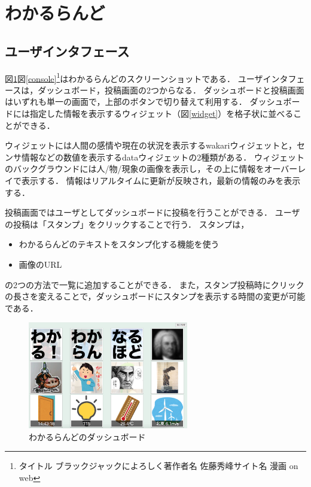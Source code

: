 \section{わかるらんど}

\subsection{ユーザインタフェース}

図\ref{dashboard}図\ref{console}\footnote{タイトル ブラックジャックによろしく\newline 著作者名 佐藤秀峰\newline サイト名 漫画 on web}はわかるらんどのスクリーンショットである．
ユーザインタフェースは，ダッシュボード，投稿画面の2つからなる．
ダッシュボードと投稿画面はいずれも単一の画面で，上部のボタンで切り替えて利用する．
ダッシュボードには指定した情報を表示するウィジェット（図\ref{widget}）を格子状に並べることができる．

ウィジェットには人間の感情や現在の状況を表示するwakariウィジェットと，センサ情報などの数値を表示するdataウィジェットの2種類がある．
ウィジェットのバックグラウンドには人/物/現象の画像を表示し，その上に情報をオーバーレイで表示する．
情報はリアルタイムに更新が反映され，最新の情報のみを表示する．

投稿画面ではユーザとしてダッシュボードに投稿を行うことができる．
ユーザの投稿は「スタンプ」をクリックすることで行う．
スタンプは，
\begin{itemize}
\item わかるらんどのテキストをスタンプ化する機能を使う
\item 画像のURL
\end{itemize}
の2つの方法で一覧に追加することができる．
また，スタンプ投稿時にクリックの長さを変えることで，ダッシュボードにスタンプを表示する時間の変更が可能である．

\begin{figure}[h]
\centering
\includegraphics[width=7cm]{images/dashboard.eps}
\caption{わかるらんどのダッシュボード}
\label{dashboard}
\end{figure}

